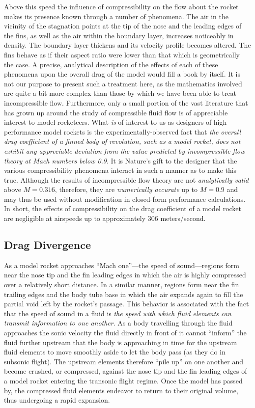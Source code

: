 Above this speed the influence of compressibility on the
flow about the rocket makes its presence known through a number
of phenomena. The air in the vicinity of the stagnation points
at the tip of the nose and the leading edges of the fins, as
well as the air within the boundary layer, increases noticeably
in density. The boundary layer thickens and its velocity
profile becomes altered. The fins behave as if their aspect
ratio were lower than that which is geometrically the case. A
precise, analytical description of the effects of each of these
phenomena upon the overall drag of the model would fill a
book by itself. It is not our purpose to present such a treatment
here, as the mathematics involved are quite a bit more complex
than those by which we have been able to treat incompressible
flow. Furthermore, only a small portion of the vast literature
that has grown up around the study of compressible fluid flow
is of appreciable interest to model rocketeers. What \emph{is} of
interest to us as designers of high-performance model rockets
is the experimentally-observed fact that \emph{the overall drag
coefficient of a finned body of revolution, such as a model
rocket, does not exhibit any appreciable deviation from the value
predicted by incompressible flow theory at Mach numbers below
0.9}. It is Nature's gift to the designer that the various
compressibility phenomena interact in such a manner as to make
this true. Although the results of incompressible flow theory
are not \emph{analytically valid} above $M = 0.316$, therefore, they
are \emph{numerically accurate} up to $M = 0.9$ and may thus be used
without modification in closed-form performance calculations.
In short, the effects of compressibility on the drag coefficient
of a model rocket are negligible at airspeeds up to approximately
306 meters/second.

\subsection{Drag Divergence}\label{ch3:sec:7.2}

As a model rocket approaches ``Mach one''---the speed of
sound---regions form near the nose tip and the fin leading
edges in which the air is highly compressed over a relatively
short distance. In a similar manner, regions form near the
fin trailing edges and the body tube base in which the air
expands again to fill the partial void left by the rocket's
passage. This behavior is associated with the fact that the
speed of sound in a fluid is \emph{the speed with which fluid elements
can transmit information to one another}. As a body travelling
through the fluid approaches the sonic velocity the fluid directly
in front of it cannot ``inform'' the fluid further upstream that
the body is approaching in time for the upstream fluid elements
to move smoothly aside to let the body pass (as they do in subsonic
flight). The upstream elements therefore ``pile up'' on one
another and become crushed, or compressed, against the nose
tip and the fin leading edges of a model rocket entering the
transonic flight regime. Once the model has passed by, the
compressed fluid elements endeavor to return to their original
volume, thus undergoing a rapid expansion.

